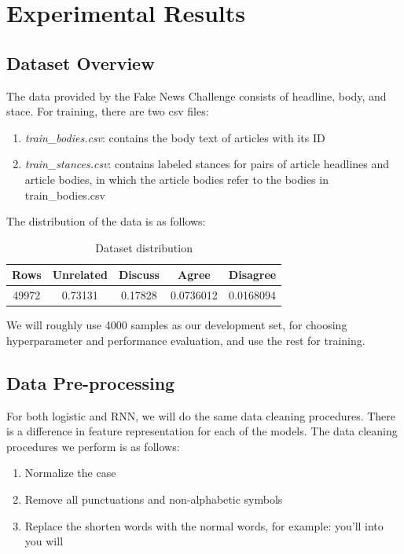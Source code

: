 \documentclass[11.5pt]{article}
\begin{document}
\section{Experimental Results}

\subsection{Dataset Overview}

The data provided by the Fake News Challenge consists of 
headline, body, and stace. 
For training, there are two csv files:
\begin{enumerate}
  \item \textit{train\_bodies.csv}: contains the body text of articles with its ID
  \item \textit{train\_stances.csv}: contains labeled stances for pairs of article 
      headlines and article bodies, in which the article bodies refer to the 
      bodies in train\_bodies.csv
\end{enumerate}

The distribution of the data is as follows:
\begin{table}[h]
  \centering
  \begin{tabular} 
    {|c|c|c|c|c|}
    \hline
    Rows & Unrelated & Discuss & Agree & Disagree \\
    \hline
    49972 & 0.73131 & 0.17828 & 0.0736012 & 0.0168094 \\
    \hline
  \end{tabular}
  \caption{Dataset distribution}
\end{table}

We will roughly use 4000 samples as our development set, for choosing 
hyperparameter and performance evaluation, and use the rest for training. 

\subsection{Data Pre-processing}

For both logistic and RNN, we will do the same data cleaning procedures. There is a difference in feature representation for each of the models.
The data cleaning procedures we perform is as follows:

\begin{enumerate}
  \item Normalize the case
  \item Remove all punctuations and non-alphabetic symbols 
  \item Replace the shorten words with the normal words, for example: you'll into you will
\end{enumerate}
\end{document}
